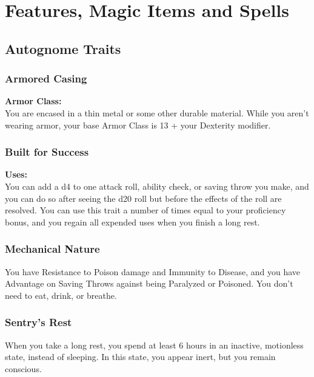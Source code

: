 \documentclass[letterpaper,openany,oneside,twocolumn]{book}
\begin{document}
\onecolumn


\rendercharactersheet

\renderbackgroundsheet

\renderspellsheet



\restoregeometry
\twocolumn

\chapter*{Features, Magic Items and Spells}

\section*{Autognome Traits}
\subsection*{Armored Casing}
\textbf{Armor Class: }\\
You are encased in a thin metal or some other durable material. While you aren't wearing armor, your base Armor Class is 13 + your Dexterity modifier.
\subsection*{Built for Success}
\textbf{Uses: }\\
You can add a d4 to one attack roll, ability check, or saving throw you make, and you can do so after seeing the d20 roll but before the effects of the roll are resolved. You can use this trait a number of times equal to your proficiency bonus, and you regain all expended uses when you finish a long rest.
\subsection*{Mechanical Nature}
You have Resistance to Poison damage and Immunity to Disease, and you have Advantage on Saving Throws against being Paralyzed or Poisoned. You don't need to eat, drink, or breathe.
\subsection*{Sentry's Rest}
When you take a long rest, you spend at least 6 hours in an inactive, motionless state, instead of sleeping. In this state, you appear inert, but you remain conscious.
\end{document}
